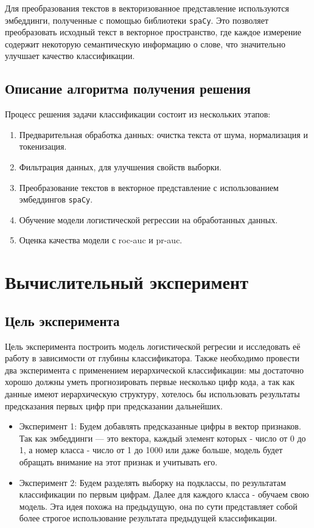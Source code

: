 \documentclass{article}
\begin{document}
Для преобразования текстов в векторизованное представление используются эмбеддинги, полученные с помощью библиотеки \texttt{spaCy}. Это позволяет преобразовать исходный текст в  векторное пространство, где каждое измерение содержит некоторую семантическую информацию о слове, что значительно улучшает качество классификации.

\subsection{Описание алгоритма получения решения}

Процесс решения задачи классификации состоит из нескольких этапов:
\begin{enumerate}
    \item Предварительная обработка данных: очистка текста от шума, нормализация и токенизация.
    \item Фильтрация данных, для улучшения свойств выборки.
    \item Преобразование текстов в векторное представление с использованием эмбеддингов \texttt{spaCy}.
    \item Обучение модели логистической регрессии на обработанных данных.
    \item Оценка качества модели с roc-auc и pr-auc.
\end{enumerate}


\section{Вычислительный эксперимент}
\subsection{Цель эксперимента}
Цель эксперимента построить модель логистической регресии и  исследовать её работу в зависимости от глубины классификатора. Также необходимо провести два эксперимента с применением иерархической классификации: мы достаточно хорошо должны уметь прогнозировать первые несколько цифр кода, а так как данные имеют иерархическую структуру, хотелось бы использовать результаты предсказания первых цифр при предсказании дальнейших.
\begin{itemize}
    \item Эксперимент 1: Будем добавлять предсказанные цифры в вектор признаков. Так как эмбеддинги --- это вектора, каждый элемент которых - число от 0 до 1, а номер класса - число от 1 до 1000 или даже больше, модель будет обращать внимание на этот признак и учитывать его.
    \item Эксперимент 2: Будем разделять выборку на подклассы, по результатам классификации по первым цифрам. Далее для каждого класса - обучаем свою модель. Эта идея похожа на предыдущую, она по сути представляет собой более строгое использование результата предыдущей классификации. 
    
\end{itemize}
\end{document}
